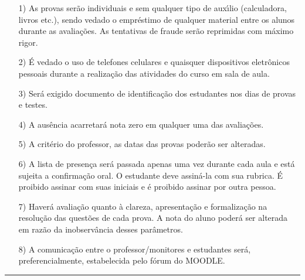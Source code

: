 \documentclass[12pt]{article}
\begin{document}
\begin{itemize}
\item[1)] As provas ser\~ao individuais e sem qualquer tipo de
aux{\'\i}lio (calculadora, livros etc.), sendo vedado o empr\'estimo de
qualquer material entre os alunos durante as avalia\c{c}\~oes. As
tentativas de fraude ser\~ao reprimidas com m\'aximo rigor.
\vspace{-0.25cm}

\item[2)] \'E vedado o uso de telefones celulares e quaisquer dispositivos eletr\^onicos pessoais durante a realiza\c{c}\~ao das atividades do curso em sala de aula. \vspace{-0.25cm}

\item[3)] Ser\'a exigido documento de identifica\c{c}\~ao dos estudantes nos
dias de provas e testes. \vspace{-0.25cm}

\item[4)] A aus\^encia acarretar\'a nota zero em qualquer uma das
avalia\c{c}\~oes. \vspace{-0.25cm}

\item[5)] A crit\'erio do professor, as datas das provas poder\~ao
ser alteradas. \vspace{-0.25cm}

\item[6)] A lista de presen\c{c}a ser\'a passada apenas uma vez
durante cada aula e est\'a sujeita a confirma\c{c}\~ao oral. O
estudante deve assin\'a-la com sua rubrica. {\'E} proibido assinar
com suas iniciais e \'e proibido assinar por outra pessoa.
\vspace{-0.25cm}

\item[7)] Haver\'a avalia{\c c}\~ao quanto {\`a} clareza, apresenta{\c
c}\~ao e formaliza{\c c}\~ao na  resolu{\c c}\~ao das quest\~oes de
cada prova. A nota do aluno poder\'a ser alterada em raz\~ao da
inobserv{\^a}ncia desses par{\^a}metros.

\item[8)] A comunica\c{c}\~ao entre o professor/monitores e estudantes ser\'a, preferencialmente,
 estabelecida pelo f\'orum do MOODLE.
\end{itemize}

\vfill
\hrule
\end{document}

